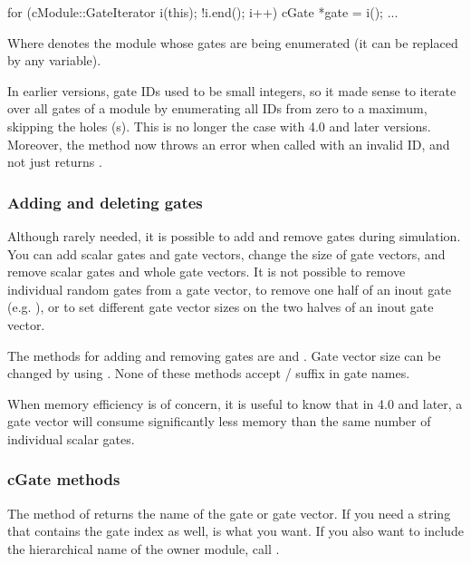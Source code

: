\begin{cpp}
for (cModule::GateIterator i(this); !i.end(); i++) {
    cGate *gate = i();
    ...
}
\end{cpp}

Where  denotes the module whose gates are being enumerated
(it can be replaced by any  variable).

\begin{note}
    In earlier {\opp} versions, gate IDs used to be small integers, so
    it made sense to iterate over all gates of a module by enumerating
    all IDs from zero to a maximum, skipping the holes (s).
    This is no longer the case with {\opp} 4.0 and later versions.
    Moreover, the  method now throws an error when called
    with an invalid ID, and not just returns .
\end{note}


\subsubsection{Adding and deleting gates}

Although rarely needed, it is possible to add and remove gates during
simulation. You can add scalar gates and gate vectors, change the size of
gate vectors, and remove scalar gates and whole gate vectors.
It is not possible to remove individual random gates from a gate vector,
to remove one half of an inout gate (e.g. ), or to set
different gate vector sizes on the two halves of an inout gate vector.

The  methods for adding and removing gates are
 and .
Gate vector size can be changed by using .
None of these methods accept  /  suffix in gate names.

\begin{note}
    When memory efficiency is of concern, it is useful to know that
    in {\opp} 4.0 and later, a gate vector will consume significantly less
    memory than the same number of individual scalar gates.
\end{note}


\subsubsection{cGate methods}

The  method of  returns the name of the
gate or gate vector. If you need a string that contains the gate index
as well,  is what you want. If you also want to
include the hierarchical name of the owner module, call .

